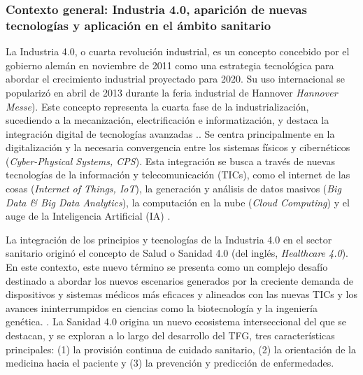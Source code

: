 
\subsubsection{Contexto general: Industria 4.0, aparición de nuevas tecnologías y aplicación en el ámbito sanitario}

La Industria 4.0, o cuarta revolución industrial, es un concepto concebido por el gobierno alemán en noviembre de 2011 como una estrategia tecnológica para abordar el crecimiento industrial proyectado para 2020. Su uso internacional se popularizó en abril de 2013 durante la feria industrial de Hannover \textit{Hannover Messe}). Este concepto representa la cuarta fase de la industrialización, sucediendo a la mecanización, electrificación e informatización, y destaca la integración digital de tecnologías avanzadas \cite{lasi2014industry}..
Se centra principalmente en la digitalización y la necesaria convergencia entre los sistemas físicos y cibernéticos (\textit{Cyber-Physical Systems, CPS}). Esta integración se busca a través de nuevas tecnologías de la información y telecomunicación (TICs), como el internet de las cosas (\textit{Internet of Things, IoT}), la generación y análisis de datos masivos (\textit{Big Data \& Big Data Analytics}), la computación en la nube (\textit{Cloud Computing}) y el auge de la Inteligencia Artificial (IA) \cite{lasi2014industry}.\cite{chen2020times}\cite{tortorella2020healthcare}




La integración de los principios y tecnologías de la Industria 4.0 en el sector sanitario originó el concepto de Salud o Sanidad 4.0 (del inglés, \textit{Healthcare 4.0})\cite{tortorella2020healthcare}\cite{tortorella2021impacts}.  %
En este contexto, este nuevo término se presenta como un complejo desafío  destinado a abordar los nuevos escenarios generados por la creciente demanda de dispositivos y sistemas médicos más eficaces y alineados con las nuevas TICs y los avances ininterrumpidos en ciencias como la biotecnología y la ingeniería genética. \cite{martin2021ehealth}. La Sanidad 4.0 origina un nuevo ecosistema interseccional del que se destacan, y se exploran a lo largo del desarrollo del TFG,  tres  características principales: (1) la provisión continua de cuidado sanitario, (2) la orientación de la medicina hacia el paciente y (3) la prevención y predicción de enfermedades.



